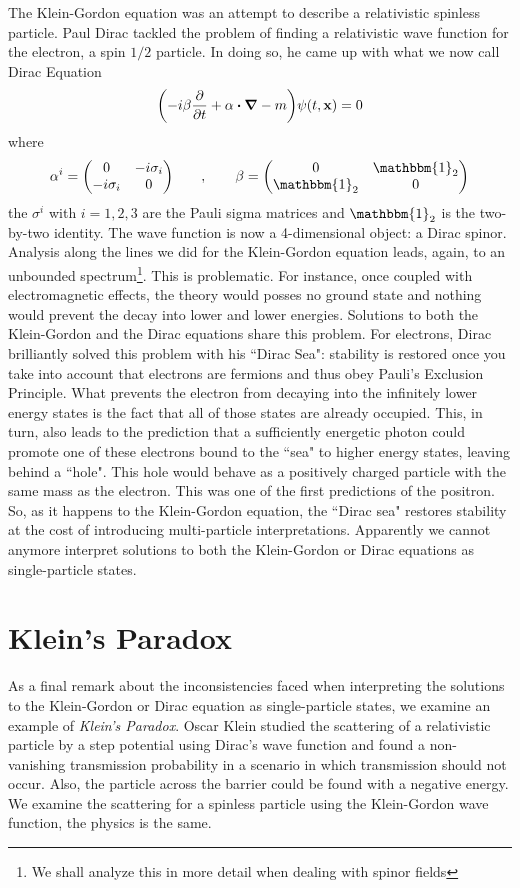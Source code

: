 The Klein-Gordon equation was an attempt to describe a relativistic spinless particle. Paul Dirac tackled the problem of finding a relativistic wave function for the electron, a spin $1/2$ particle. In doing so, he came up with what we now call Dirac Equation
\begin{equation}
    \qty(-i\beta\pdv{t}+\alpha\vdot\grad - m)\psi(t,\vb{x})=0
\end{equation}
where
\begin{equation}
    \alpha^i=\mqty(0 & -i\sigma_i\\ -i\sigma_i &  0)\qquad,\qquad\beta=\mqty(0 & \mathbbm{1}_2\\\mathbbm{1}_2 & 0)
\end{equation}
the $\sigma^i$ with $i=1,2,3$ are the Pauli sigma matrices and $\mathbbm{1}_2$ is the two-by-two identity. The wave function is now a 4-dimensional object: a Dirac spinor. Analysis along the lines we did for the Klein-Gordon equation leads, again, to an unbounded spectrum\footnote{We shall analyze this in more detail when dealing with spinor fields}. This is problematic. For instance, once coupled with electromagnetic effects, the theory would posses no ground state and nothing would prevent the decay into lower and lower energies. Solutions to both the Klein-Gordon and the Dirac equations share this problem. For electrons, Dirac  brilliantly solved this problem with his ``Dirac Sea": stability is restored once you take into account that electrons are fermions and  thus obey Pauli's Exclusion Principle. What prevents the electron from decaying into the infinitely lower energy states is the fact that all of those states are already occupied. This, in turn, also leads to the prediction that a sufficiently energetic photon could promote one of these electrons bound to the ``sea" to higher energy states, leaving behind a ``hole". This hole would behave as a positively charged particle with the same mass as the electron. This was one of the first predictions of the positron. \\

So, as it happens to the Klein-Gordon equation, the ``Dirac sea" restores stability at the cost of introducing multi-particle interpretations. Apparently we cannot anymore interpret solutions to both the Klein-Gordon or Dirac equations as single-particle states.\\
\section{Klein's Paradox}
As a final remark about the inconsistencies faced when interpreting the solutions to the Klein-Gordon or Dirac equation as single-particle states, we examine an example of \textit{Klein's Paradox}. Oscar Klein studied the scattering of a relativistic particle by a step potential using Dirac's wave function and found a non-vanishing transmission probability in a scenario in which transmission should not occur. Also, the particle across the barrier could be found with a negative energy. We examine the scattering for a spinless particle using the Klein-Gordon wave function, the physics is the same.\\

